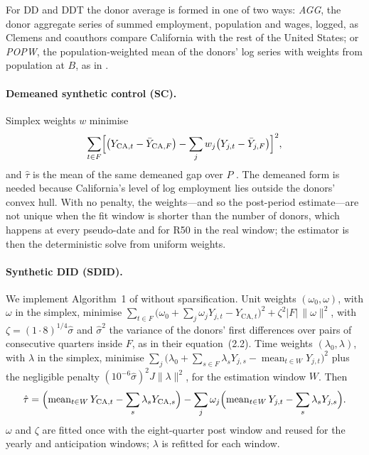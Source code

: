 For DD and DDT the donor average is formed in one of two ways: \emph{AGG}, the donor aggregate
series of summed employment, population and wages, logged, as Clemens and coauthors compare
California with the rest of the United States; or \emph{POPW}, the population-weighted mean of the
donors' log series with weights from population at $B$, as in \citet{dube2026labor}.

\paragraph{Demeaned synthetic control (SC).} Simplex weights $w$ minimise
\begin{equation}
\sum_{t\in F}\Bigl[\bigl(Y_{\mathrm{CA},t} - \bar Y_{\mathrm{CA},F}\bigr)
  - \sum_j w_j\bigl(Y_{j,t} - \bar Y_{j,F}\bigr)\Bigr]^2,
\end{equation}
and $\hat\tau$ is the mean of the same demeaned gap over $P$ \citep{doudchenko2016balancing,ferman2021synthetic}.
The demeaned form is needed because California's level of log employment lies outside the donors'
convex hull. With no penalty, the weights---and so the post-period estimate---are not unique when
the fit window is shorter than the number of donors, which happens at every pseudo-date and for R50
in the real window; the estimator is then the deterministic solve from uniform weights.

\paragraph{Synthetic DID (SDID).} We implement Algorithm~1 of \citet{arkhangelsky2021synthetic}
without sparsification. Unit weights $(\omega_0, \omega)$, with $\omega$ in the simplex, minimise
$\sum_{t\in F}\bigl(\omega_0 + \sum_j \omega_j Y_{j,t} - Y_{\mathrm{CA},t}\bigr)^2 + \zeta^2|F|\,\lVert\omega\rVert^2$,
with $\zeta = (1\cdot 8)^{1/4}\hat\sigma$ and $\hat\sigma^2$ the variance of the donors' first
differences over pairs of consecutive quarters inside $F$, as in their equation~(2.2). Time weights
$(\lambda_0, \lambda)$, with $\lambda$ in the simplex, minimise
$\sum_j\bigl(\lambda_0 + \sum_{s\in F}\lambda_s Y_{j,s} - \operatorname{mean}_{t\in W} Y_{j,t}\bigr)^2$
plus the negligible penalty $(10^{-6}\hat\sigma)^2 J\lVert\lambda\rVert^2$, for the estimation window
$W$. Then
\begin{equation}
\hat\tau = \Bigl(\operatorname{mean}_{t\in W} Y_{\mathrm{CA},t} - \sum_{s}\lambda_s Y_{\mathrm{CA},s}\Bigr)
  - \sum_j\omega_j\Bigl(\operatorname{mean}_{t\in W} Y_{j,t} - \sum_s\lambda_s Y_{j,s}\Bigr).
\end{equation}
$\omega$ and $\zeta$ are fitted once with the eight-quarter post window and reused for the yearly and
anticipation windows; $\lambda$ is refitted for each window.

